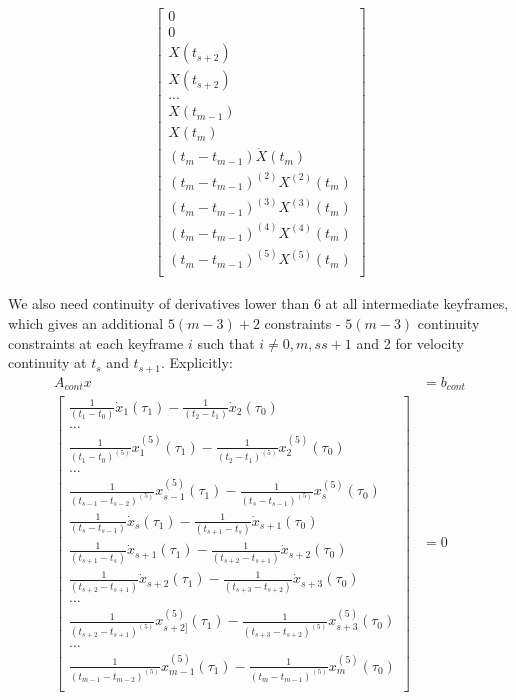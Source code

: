 \documentclass[11pt]{article}
\begin{document}
\begin{align}
\begin{bmatrix}
 0 \\
 0 \\
X(t_{s+2}) \\
X(t_{s+2}) \\
... \\
    X(t_{m-1}) \\
    X(t_m) \\
  (t_m-t_{m-1}) \dot{X} (t_m) \\
  (t_m-t_{m-1})^{(2)}  X^{(2)} (t_m) \\
     (t_m-t_{m-1})^{(3)}  X^{(3)} (t_m) \\
    (t_m-t_{m-1})^{(4)}  X^{(4)} (t_m) \\
   (t_m-t_{m-1})^{(5)}  X^{(5)} (t_m) \\ 
 \end{bmatrix} 
\end{align}


We also need continuity of derivatives lower than 6 at all intermediate keyframes, which gives an additional $5(m-3)+2$ constraints - $5(m-3)$ continuity constraints at each keyframe $i$ such that $i \ne 0, m, s s+1$ and 2 for velocity continuity at $t_{s}$ and $t_{s+1}$. Explicitly: 
 \begin{align*}
 A_{cont} x &= b_{cont} \\
 \begin{bmatrix}
  \frac{1}{(t_1-t_0)} \dot{x}_1 (\tau_1) - \frac{1}{(t_2-t_1)} \dot{x}_2(\tau_0) \\
  ... \\
  \frac{1}{(t_1-t_0)^{(5)}} x^{(5)}_1 (\tau_1) - \frac{1}{(t_2-t_1)^{(5)}} x^{(5)}_2 (\tau_0) \\
  ... \\
  \frac{1}{(t_{s-1}-t_{s-2})^{(5)}} x^{(5)}_{s-1} (\tau_1) - \frac{1}{(t_s-t_{s-1})^{(5)}} x^{(5)}_s (\tau_0) \\
 \frac{1}{(t_{s}-t_{s-1})} \dot{x}_{s} (\tau_1) -  \frac{1}{(t_{s+1}-t_{s})}  \dot{x}_{s+1} (\tau_0) \\
  \frac{1}{(t_{s+1}-t_{s})} \dot{x}_{s+1} (\tau_1) -  \frac{1}{(t_{s+2}-t_{s+1})}  \dot{x}_{s+2} (\tau_0) \\
  \frac{1}{(t_{s+2}-t_{s+1})} \dot{x}_{s+2} (\tau_1) - \frac{1}{(t_{s+3}-t_{s+2})} \dot{x}_{s+3}(\tau_0) \\
  ... \\
  \frac{1}{(t_{s+2}-t_{s+1})^{(5)}} x^{(5)}_{s+2]} (\tau_1) - \frac{1}{(t_{s+3}-t_{s+2})^{(5)}} x^{(5)}_{s+3} (\tau_0) \\
  ... \\
  \frac{1}{(t_{m-1}-t_{m-2})^{(5)}} x^{(5)}_{m-1} (\tau_1) - \frac{1}{(t_m-t_{m-1})^{(5)}} x^{(5)}_m (\tau_0) \\
 \end{bmatrix} 
 &= 0
 \end{align*}
 
\end{document}
